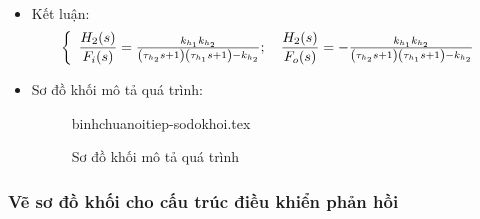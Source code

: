 \begin{itemize}
\begin{align*}
            \end{align*}
        \item Kết luận:
            \begin{align*}
                \left\{\begin{array}{l}
                    \dfrac{H_2(s)}{F_i(s)} = \frac{k_{h_1} k_{h_2}}{\left({\tau_{h_2}s + 1}\right)\left({\tau_{h_1} s + 1}\right) - k_{h_2}}; \quad \dfrac{H_2(s)}{F_o(s)} = -\frac{k_{h_1} k_{h_2}}{\left({\tau_{h_2}s + 1}\right)\left({\tau_{h_1} s + 1}\right) - k_{h_2}}
                \end{array}\right.
            \end{align*}
        \item Sơ đồ khối mô tả quá trình:
            \begin{figure}[htp]
                \begin{center}
                    {binhchuanoitiep-sodokhoi.tex}
                \end{center}
                \caption{Sơ đồ khối mô tả quá trình} \label{Fig:binhchuanoitiep-sodokhoi}
            \end{figure}
    \end{itemize}

\subsubsection{Vẽ sơ đồ khối cho cấu trúc điều khiển phản hồi}
